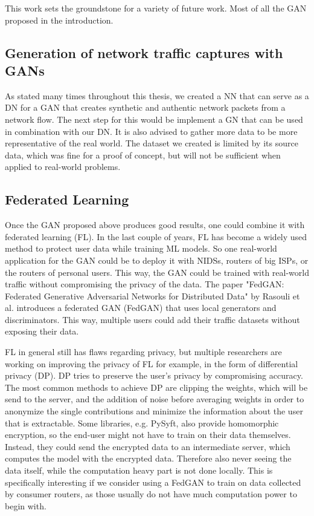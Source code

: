 \documentclass[
	ngerman,
	ruledheaders=section,%
	class=report,%
	thesis={type=bachelor},%
	accentcolor=9c,%
	custommargins=true,%
	marginpar=false,%
	parskip=half-,%
	fontsize=11pt,%
	twoside
]{tudapub}
\begin{document}
This work sets the groundstone for a variety of future work.
Most of all the GAN proposed in the introduction.

\subsection{Generation of network traffic captures with GANs}
\label{sec:futureGAN}

As stated many times throughout this thesis, we created a NN that can serve as a DN for a GAN that creates synthetic and authentic network packets from a network flow.
The next step for this would be implement a GN that can be used in combination with our DN.
It is also advised to gather more data to be more representative of the real world.
The dataset we created is limited by its source data, which was fine for a proof of concept, but will not be sufficient when applied to real-world problems.

\subsection{Federated Learning}
\label{sec:FL}

Once the GAN proposed above produces good results, one could combine it with federated learning (FL).
In the last couple of years, FL has become a widely used method to protect user data while training ML models.
So one real-world application for the GAN could be to deploy it with NIDSs, routers of big ISPs, or the routers of personal users.
This way, the GAN could be trained with real-world traffic without compromising the privacy of the data.
The paper "FedGAN: Federated Generative Adversarial Networks for Distributed Data" by Rasouli et al. \cite{rasouliFedGANFederatedGenerative2020} introduces a federated GAN (FedGAN) that uses local generators and discriminators.
This way, multiple users could add their traffic datasets without exposing their data.

FL in general still has flaws regarding privacy, but multiple researchers are working on improving the privacy of FL for example, in the form of differential privacy (DP).
DP tries to preserve the user's privacy by compromising accuracy.
The most common methods to achieve DP are clipping the weights, which will be send to the server, and the addition of noise before averaging weights in order to anonymize the single contributions and minimize the information about the user that is extractable.
Some libraries, e.g. PySyft, also provide homomorphic encryption, so the end-user might not have to train on their data themselves.
Instead, they could send the encrypted data to an intermediate server, which computes the model with the encrypted data.
Therefore also never seeing the data itself, while the computation heavy part is not done locally.
This is specifically interesting if we consider using a FedGAN to train on data collected by consumer routers,
as those usually do not have much computation power to begin with.
\end{document}
